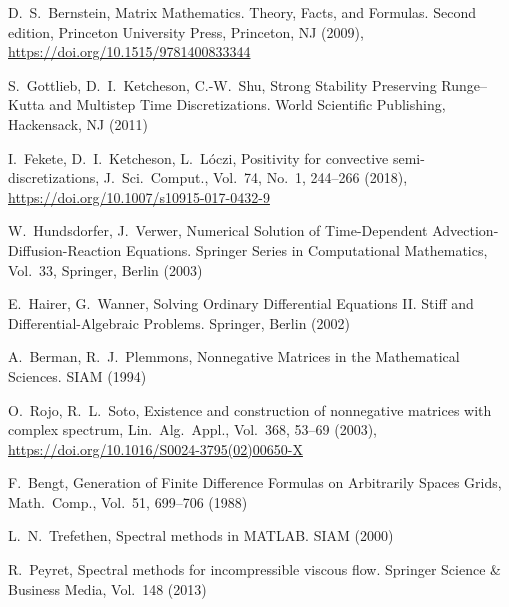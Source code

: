 \documentclass[a4paper]{article}
\begin{document}
\begin{thebibliography}{99}

D.~S.~Bernstein, Matrix Mathematics. Theory, Facts, and Formulas. Second edition, Princeton University Press, Princeton, NJ (2009), \href{https://doi.org/10.1515/9781400833344}{https://doi.org/10.1515/9781400833344}

{S.~Gottlieb,  D.~I.~Ketcheson,  C.-W.~Shu}, {Strong Stability Preserving {R}unge--{K}utta and Multistep Time Discretizations}. {World Scientific Publishing, Hackensack, NJ} ({2011})

I.~Fekete, D.~I.~Ketcheson, L.~L\'oczi, Positivity for convective semi-discretizations, J.~Sci.~Comput., Vol.~74, No.~1, 244--266 (2018), \href{https://doi.org/10.1007/s10915-017-0432-9}{https://doi.org/10.1007/s10915-017-0432-9}


W.~Hundsdorfer, J.~Verwer, Numerical Solution of Time-Dependent Advection-Diffusion-Reaction
Equations. Springer Series in Computational Mathematics, Vol.~33, Springer, Berlin (2003)    

E.~Hairer, G.~Wanner, Solving Ordinary Differential Equations II. Stiff
and Differential-Algebraic Problems. Springer, Berlin (2002)

 A.~Berman, R.~J.~Plemmons, Nonnegative Matrices in the Mathematical Sciences. SIAM (1994)
 
O.~Rojo, R.~L.~Soto, Existence and construction of nonnegative matrices with complex spectrum, 
Lin.~Alg.~Appl., Vol.~368, 53--69 (2003), \href{https://doi.org/10.1016/S0024-3795(02)00650-X}{https://doi.org/10.1016/S0024-3795(02)00650-X}

F.~Bengt, Generation of Finite Difference Formulas on Arbitrarily Spaces Grids, Math.~Comp., Vol.~51, 699--706 (1988)

L.~N.~Trefethen, Spectral methods in MATLAB. SIAM (2000)

R.~Peyret, Spectral methods for incompressible viscous flow. Springer Science \& Business Media, Vol.~148 
(2013)

\end{thebibliography}
\end{document}
